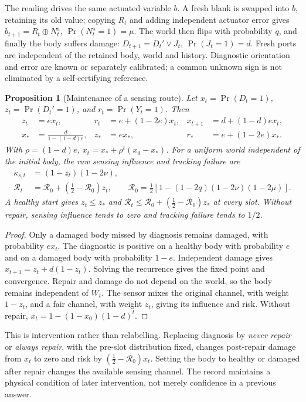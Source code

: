 \documentclass[11pt,a4paper]{article}
\newtheorem{proposition}[definition]{Proposition}
\begin{document}
The reading drives the same actuated variable \(b\). A fresh blank is
swapped into \(b\), retaining its old value; copying \(R_t\) and adding
independent actuator error gives \(b_{t+1}=R_t\oplus N_t^{\mathrm a}\),
\(\Pr(N_t^{\mathrm a}=1)=\mu\).
The world then flips with probability \(q\), and finally the body suffers
damage: \(D_{t+1}=D_t'\lor J_t\), \(\Pr(J_t=1)=d\).
Fresh ports are independent of the retained body, world and history.
Diagnostic orientation and error are known or separately calibrated;
a common unknown sign is not eliminated by a self-certifying reference.

\begin{proposition}[Maintenance of a sensing route]\label{prop:body}
Let \(x_t=\Pr(D_t=1)\), \(z_t=\Pr(D_t'=1)\), and \(r_t=\Pr(Y_t=1)\).
Then
\begin{align}
z_t&=ex_t,& r_t&=e+(1-2e)x_t,&
x_{t+1}&=d+(1-d)ex_t, \label{eq:repairrec}\\
x_*&=\frac{d}{1-(1-d)e},&
z_*&=ex_*,&r_*&=e+(1-2e)x_*.\label{eq:repairstar}
\end{align}
With \(\rho=(1-d)e\), \(x_t=x_*+\rho^t(x_0-x_*)\).
For a uniform world independent of the initial body, the raw sensing
influence and tracking failure are
\begin{align}
\kappa_{\mathrm s,t}&=(1-z_t)(1-2\nu),\\
\mathcal R_t&=\mathcal R_0+(\tfrac12-\mathcal R_0)z_t,\qquad
\mathcal R_0=\tfrac12[1-(1-2q)(1-2\nu)(1-2\mu)].
\label{eq:bodyrisk}
\end{align}
A healthy start gives \(z_t\le z_*\) and
\(\mathcal R_t\le\mathcal R_0+(\tfrac12-\mathcal R_0)z_*\) at every
slot. Without repair, sensing influence tends to zero and tracking
failure tends to \(1/2\).
\end{proposition}
\begin{proof}
Only a damaged body missed by diagnosis remains damaged, with
probability \(ex_t\). The diagnostic is positive on a healthy body
with probability \(e\) and on a damaged body with probability \(1-e\).
Independent damage gives \(x_{t+1}=z_t+d(1-z_t)\). Solving the
recurrence gives the fixed point and convergence. Repair and damage
do not depend on the world, so the body remains independent of \(W_t\).
The sensor mixes the original channel, with weight \(1-z_t\), and
a fair channel, with weight \(z_t\), giving its influence and risk.
Without repair, \(x_t=1-(1-x_0)(1-d)^t\).
\end{proof}

This is intervention rather than relabelling. Replacing diagnosis
by \emph{never repair} or \emph{always repair}, with the pre-slot
distribution fixed, changes post-repair damage from \(x_t\) to zero
and risk by \((\tfrac12-\mathcal R_0)x_t\). Setting the body to
healthy or damaged after repair changes the available sensing channel.
The record maintains a physical condition of later intervention,
not merely confidence in a previous answer.
\end{document}
